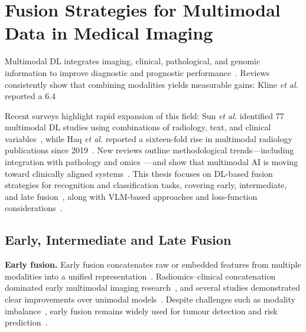 \documentclass[final,british,a4paper,12pt]{phdthesis}
\begin{document}
\section{Fusion Strategies for Multimodal Data in Medical Imaging}

Multimodal DL integrates imaging, clinical, pathological, and genomic information to improve diagnostic and prognostic performance~\cite{huang2020fusion,mohsen2022artificial}. Reviews consistently show that combining modalities yields measurable gains: Kline \textit{et al.} reported a 6.4%

Recent surveys highlight rapid expansion of this field: Sun \textit{et al.} identified 77 multimodal DL studies using combinations of radiology, text, and clinical variables~\cite{sun2023scoping}, while Haq \textit{et al.} reported a sixteen-fold rise in multimodal radiology publications since 2019~\cite{haq2025mmml}. New reviews outline methodological trends—including integration with pathology and omics~\cite{Tariq2025,li2024review,simon2025multimodal}—and show that multimodal AI is moving toward clinically aligned systems~\cite{huang2020fusion,kline2022multimodal}. This thesis focuses on DL-based fusion strategies for recognition and classification tasks, covering early, intermediate, and late fusion~\cite{mohsen2022artificial,stahlschmidt2022}, along with VLM-based approaches and loss-function considerations~\cite{huang2020fusion,kline2022multimodal,li2024review}.

\subsection{Early, Intermediate and Late Fusion}

\textbf{Early fusion.} Early fusion concatenates raw or embedded features from multiple modalities into a unified representation~\cite{stahlschmidt2022,mohsen2022artificial}. Radiomics–clinical concatenation dominated early multimodal imaging research~\cite{mohsen2022artificial}, and several studies demonstrated clear improvements over unimodal models~\cite{huang2020fusion,kharazmi2018feature,yap2018multimodal}. Despite challenges such as modality imbalance~\cite{mohsen2022artificial}, early fusion remains widely used for tumour detection and risk prediction~\cite{yala2019deep,sun2025deep,xiao2025novel,hsu2021deep}.
\end{document}
